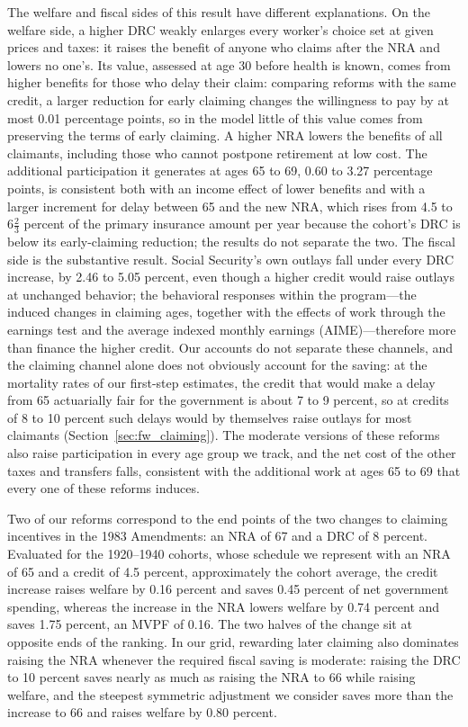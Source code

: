 The welfare and fiscal sides of this result have different explanations. On the welfare side, a higher DRC weakly enlarges every worker's choice set at given prices and taxes: it raises the benefit of anyone who claims after the NRA and lowers no one's. Its value, assessed at age 30 before health is known, comes from higher benefits for those who delay their claim: comparing reforms with the same credit, a larger reduction for early claiming changes the willingness to pay by at most 0.01 percentage points, so in the model little of this value comes from preserving the terms of early claiming. A higher NRA lowers the benefits of all claimants, including those who cannot postpone retirement at low cost. The additional participation it generates at ages 65 to 69, 0.60 to 3.27 percentage points, is consistent both with an income effect of lower benefits and with a larger increment for delay between 65 and the new NRA, which rises from 4.5 to $6\tfrac{2}{3}$ percent of the primary insurance amount per year because the cohort's DRC is below its early-claiming reduction; the results do not separate the two. The fiscal side is the substantive result. Social Security's own outlays fall under every DRC increase, by 2.46 to 5.05 percent, even though a higher credit would raise outlays at unchanged behavior; the behavioral responses within the program---the induced changes in claiming ages, together with the effects of work through the earnings test and the average indexed monthly earnings (AIME)---therefore more than finance the higher credit. Our accounts do not separate these channels, and the claiming channel alone does not obviously account for the saving: at the mortality rates of our first-step estimates, the credit that would make a delay from 65 actuarially fair for the government is about 7 to 9 percent, so at credits of 8 to 10 percent such delays would by themselves raise outlays for most claimants (Section~\ref{sec:fw_claiming}). The moderate versions of these reforms also raise participation in every age group we track, and the net cost of the other taxes and transfers falls, consistent with the additional work at ages 65 to 69 that every one of these reforms induces.

Two of our reforms correspond to the end points of the two changes to claiming incentives in the 1983 Amendments: an NRA of 67 and a DRC of 8 percent. Evaluated for the 1920--1940 cohorts, whose schedule we represent with an NRA of 65 and a credit of 4.5 percent, approximately the cohort average, the credit increase raises welfare by 0.16 percent and saves 0.45 percent of net government spending, whereas the increase in the NRA lowers welfare by 0.74 percent and saves 1.75 percent, an MVPF of 0.16. The two halves of the change sit at opposite ends of the ranking. In our grid, rewarding later claiming also dominates raising the NRA whenever the required fiscal saving is moderate: raising the DRC to 10 percent saves nearly as much as raising the NRA to 66 while raising welfare, and the steepest symmetric adjustment we consider saves more than the increase to 66 and raises welfare by 0.80 percent.

